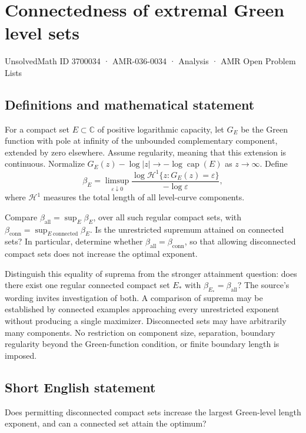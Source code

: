 \documentclass[11pt,a4paper]{article}
\begin{document}
\section*{Connectedness of extremal Green level sets}\label{3700034}
{\small UnsolvedMath ID 3700034 · AMR-036-0034 · Analysis · AMR Open Problem Lists}
\subsection{Definitions and mathematical statement}
For a compact set $E\subset\mathbb C$ of positive
logarithmic capacity, let $G_E$ be the Green
function with pole at infinity of the unbounded
complementary component, extended by zero elsewhere.
Assume regularity, meaning that this extension
is continuous. Normalize
$G_E(z)-\log|z|\to-\log\operatorname{cap}(E)$
as $z\to\infty$.
Define
\[
 \beta_E=\limsup_{\varepsilon\downarrow0}
 \frac{\log\mathcal H^1\{z:G_E(z)=\varepsilon\}}
                         {-\log\varepsilon},
\]
where $\mathcal H^1$ measures the total length
of all level-curve components.

Compare
$\beta_{\mathrm{all}}=\sup_E\beta_E$, over
all such regular compact sets, with
$\beta_{\mathrm{conn}}=\sup_{E\ \mathrm{connected}}\beta_E$.
Is the unrestricted supremum attained on
connected sets? In particular, determine whether
$\beta_{\mathrm{all}}=\beta_{\mathrm{conn}}$,
so that allowing disconnected compact sets
does not increase the optimal exponent.

Distinguish this equality of suprema from the
stronger attainment question: does there exist
one regular connected compact set $E_*$ with
$\beta_{E_*}=\beta_{\mathrm{all}}$? The
source's wording invites investigation of both.
A comparison of suprema may be established
by connected examples approaching every
unrestricted exponent without producing a
single maximizer.
Disconnected sets may have arbitrarily many
components. No restriction on component size,
separation, boundary regularity beyond the
Green-function condition, or finite boundary
length is imposed.
\subsection{Short English statement}
Does permitting disconnected compact sets increase the largest Green-level length exponent, and can a connected set attain the optimum?
\end{document}
